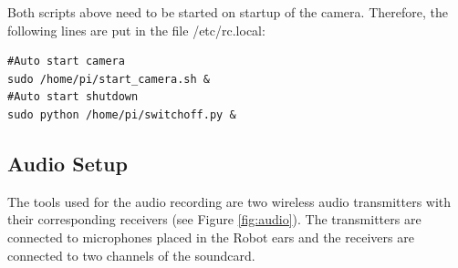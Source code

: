 Both scripts above need to be started on startup of the camera. Therefore, the following lines are put in the file /etc/rc.local:
\begin{center}
\begin{minipage}{0.9\linewidth}
\begin{lstlisting}[caption=$/etc/rc.local$, label=local, frame=none]
#Auto start camera
sudo /home/pi/start_camera.sh &
#Auto start shutdown
sudo python /home/pi/switchoff.py &
\end{lstlisting}
\end{minipage}
\end{center}

\newpage
\subsection{Audio Setup}
The tools used for the audio recording are two wireless audio transmitters with their corresponding 
receivers (see Figure \ref{fig:audio}). The transmitters are connected to microphones placed in the Robot ears and the receivers are connected to two channels of the soundcard.

